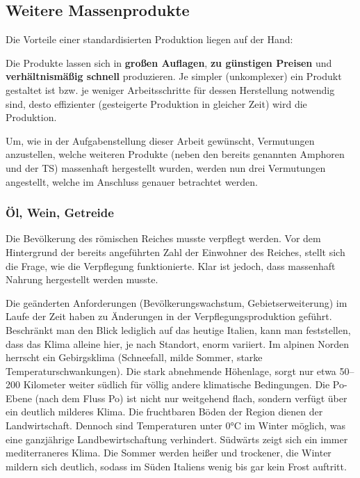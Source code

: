 \documentclass[
    a4paper,
    11pt,
    bibliography=totoc,
    listof=totoc,
    parskip=half,
    headings=normal
]{scrbook}
\begin{document}
\subsection{Weitere Massenprodukte}
Die Vorteile einer standardisierten Produktion liegen auf der Hand:

Die Produkte lassen sich in \textbf{großen Auflagen}, \textbf{zu günstigen Preisen} und \textbf{verhältnismäßig schnell} produzieren. Je simpler (unkomplexer) ein Produkt gestaltet ist bzw. je weniger Arbeitsschritte für dessen Herstellung notwendig sind, desto effizienter (gesteigerte Produktion in gleicher Zeit) wird die Produktion.

Um, wie in der Aufgabenstellung dieser Arbeit gewünscht, Vermutungen anzustellen, welche weiteren Produkte (neben den bereits genannten Amphoren und der TS) massenhaft hergestellt wurden, werden nun drei Vermutungen angestellt, welche im Anschluss genauer betrachtet werden.

\subsubsection{Öl, Wein, Getreide}
Die Bevölkerung des römischen Reiches musste verpflegt werden. Vor dem Hintergrund der bereits angeführten Zahl der Einwohner des Reiches, stellt sich die Frage, wie die Verpflegung funktionierte. Klar ist jedoch, dass massenhaft Nahrung hergestellt werden musste.

Die geänderten Anforderungen (Bevölkerungswachstum, Gebietserweiterung) im Laufe der Zeit haben zu Änderungen in der Verpflegungsproduktion geführt. Beschränkt man den Blick lediglich auf das heutige Italien, kann man feststellen, dass das Klima alleine hier, je nach Standort, enorm variiert. Im alpinen Norden herrscht ein Gebirgsklima (Schneefall, milde Sommer, starke Temperaturschwankungen). Die stark abnehmende Höhenlage, sorgt nur etwa 50--200 Kilometer weiter südlich für völlig andere klimatische Bedingungen. Die Po-Ebene (nach dem Fluss Po) ist nicht nur weitgehend flach, sondern verfügt über ein deutlich milderes Klima. Die fruchtbaren Böden der Region dienen der Landwirtschaft. Dennoch sind Temperaturen unter 0°C im Winter möglich, was eine ganzjährige Landbewirtschaftung verhindert.
Südwärts zeigt sich ein immer mediterraneres Klima. Die Sommer werden heißer und trockener, die Winter mildern sich deutlich, sodass im Süden Italiens wenig bis gar kein Frost auftritt. \autocite[vgl. "Klima"][]{dewiki:262975683}
\end{document}
